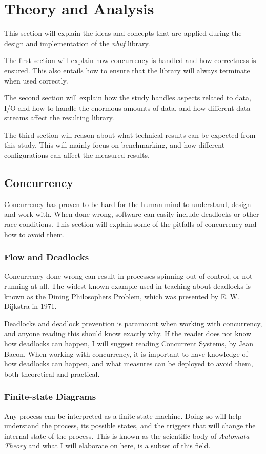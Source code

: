 \documentclass[a4paper]{article}
\newcommand{\nbuf}{\textit{nbuf} }
\begin{document}
\newpage
\section{Theory and Analysis}
This section will explain the ideas and concepts that are applied during the design and implementation of the \nbuf library. 

The first section will explain how concurrency is handled and how correctness is ensured. This also entails how to ensure that the library will always terminate when used correctly. 

The second section will explain how the study handles aspects related to data, I/O and how to handle the enormous amounts of data, and how different data streams affect the resulting library.

The third section will reason about what technical results can be expected from this study. This will mainly focus on benchmarking, and how different configurations can affect the measured results.



\subsection{Concurrency}
Concurrency has proven to be hard for the human mind to understand, design and work with. When done wrong, software can easily
include deadlocks or other race conditions. This section will explain some of the pitfalls of concurrency and how to avoid them.


\subsubsection{Flow and Deadlocks}
Concurrency done wrong can result in processes spinning out of control, or not running at all. The widest known example used in teaching about deadlocks is known as the Dining Philosophers Problem, which was presented by E. W. Dijkstra in 1971\cite{Dijkstra:2002:HOS:762971.762977}. 

Deadlocks and deadlock prevention is paramount when working with concurrency, and anyone reading this should know exactly why. If the reader does not know how deadlocks can happen, I will suggest reading Concurrent Systems, by Jean Bacon\cite{opac-b1093825}. When working with concurrency, it is important to have knowledge of how deadlocks can happen, and what measures can be deployed to avoid them, both theoretical and practical.


\subsubsection{Finite-state Diagrams}
Any process can be interpreted as a finite-state machine. Doing so will help understand the process, its possible states, and the triggers that will change the internal state of the process. This is known as the scientific body of \textit{Automata Theory} and what I will elaborate on here, is a subset of this field.
\end{document}
